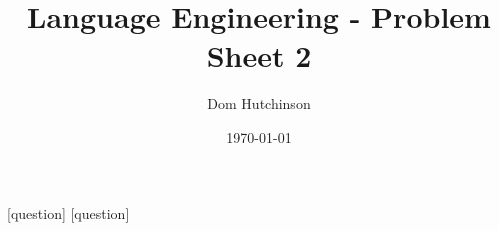 \documentclass[11pt,a4paper]{article}
\begin{document}
\pagestyle{fancy}
\setlength\parindent{0pt}
\allowdisplaybreaks

[question]
[question]

\newcommand{\nats}{\mathbb{N}}
\newcommand{\newquestion} {\stepcounter{question}}
\newcommand{\newqpart} {\stepcounter{qpart}}
\newcommand{\newspart} {\stepcounter{spart}}
\newcommand{\question}[2] {\newquestion \ifquestions \textbf{Question 1.\arabic{question} - #1}\\ #2\\ \fi}
\newcommand{\qpart}[1] {\newqpart \ifquestions \textbf{Question 1.\arabic{question}.\arabic{qpart}}\\ #1\\ \fi}
\newcommand{\solution}[1] {\ifsolutions\textbf{My Solution \arabic{question}}\\ #1\\ \fi}
\newcommand{\spart}[1] {\newspart\ifsolutions\textbf{My Solution \arabic{question}.\arabic{spart}}\\ #1\\ \fi}
\newcommand{\codesol} {\newspart\ifsolutions\textbf{My Solution \arabic{question}.\arabic{spart}}\fi}

\newcommand{\doubleplus} {+\kern-1.3ex+\kern0.8ex}
\renewcommand{\headrulewidth}{0pt}

  {\lstset{mathescape=true}}
  {}

\newif\ifquestions
\questionstrue
\newif\ifsolutions
\solutionstrue

\title{Language Engineering - Problem Sheet 2}
\author{Dom Hutchinson}
\date{\today}
\maketitle

\fancyhead[R]{\today}
\end{document}

